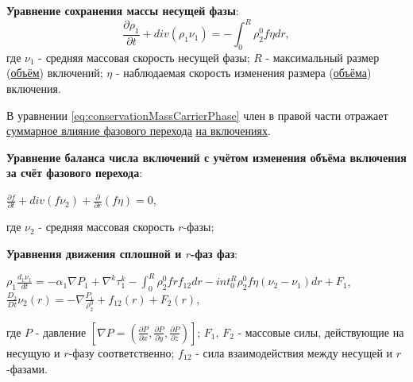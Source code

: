 \documentclass[12pt, a4paper]{report}
\begin{document}
	\textbf{Уравнение сохранения массы несущей фазы}:
	\begin{equation}\label{eq:conservationMassCarrierPhase}
		\frac{\partial \rho_{1}}{\partial t} + div(\rho_{1} \nu_{1}) = -\int_{0}^{R} \rho_{2}^{0} f \eta dr,
	\end{equation}
	где $\nu_{1}$ - средняя массовая скорость несущей фазы; $R$ - максимальный размер (\underline{объём}) включений; $\eta$ - наблюдаемая скорость изменения размера (\underline{объёма}) включения. \par
	В уравнении \eqref{eq:conservationMassCarrierPhase} член в правой части отражает \underline{суммарное влияние фазового перехода} \underline{на включениях}. \par
	\textbf{Уравнение баланса числа включений с учётом изменения объёма включения за счёт фазового перехода}:
	\begin{center}
		$\frac{\partial f}{\partial t} + div(f \nu_{2}) + \frac{\partial}{\partial r}(f \eta) = 0$,
	\end{center}
	где $\nu_{2}$ - средняя массовая скорость $r$-фазы; \par
	\textbf{Уравнения движения сплошной и $r$-фаз фаз}:
	\begin{center}
		$\rho_{1} \frac{d_{1} \nu_{1}}{dt} = -\alpha_{1} \nabla P_{1} + \nabla^{k} \tau_{1}^{k} - \int_{0}^{R} \rho_{2}^{0} f r f_{12} dr - int_{0}^{R} \rho_{2}^{0} f \eta (\nu_{2} - \nu_{1}) dr + F_{1}$, \\
		$\frac{D_{2}}{Dt}\nu_{2}(r) = - \nabla \frac{P_{1}}{\rho_{2}^{0}} + f_{12}(r) + F_{2}(r)$,	
	\end{center}
	где $P$ - давление $[\nabla P = (\frac{\partial P}{\partial x}, \frac{\partial P}{\partial y}, \frac{\partial P}{\partial z})]$; $F_{1}$, $F_{2}$ - массовые силы, действующие на несущую и $r$-фазу соответственно; $f_{12}$ - сила взаимодействия между несущей и $r$-фазами.
\end{document}
